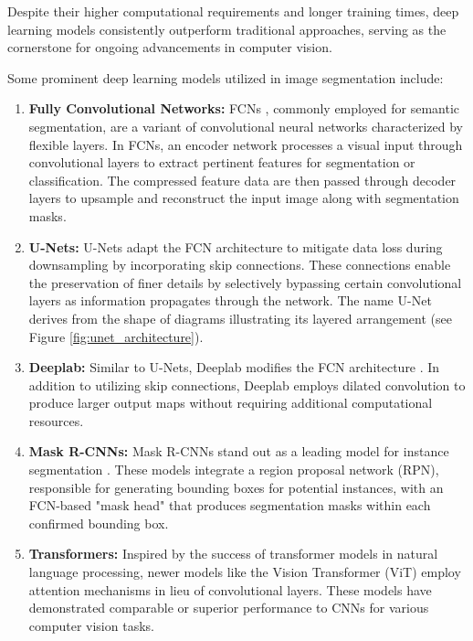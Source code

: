 Despite their higher computational requirements and longer training times, deep learning models consistently outperform traditional approaches, serving as the cornerstone for ongoing advancements in computer vision.

Some prominent deep learning models utilized in image segmentation include:

\begin{enumerate}
  \item \textbf{Fully Convolutional Networks:} FCNs \cite{FCNLong2015}, commonly employed for semantic segmentation, are a
  variant
  of
  convolutional neural networks characterized by flexible layers. In FCNs, an encoder network processes a visual input
  through convolutional layers to extract pertinent features for segmentation or classification. The compressed
  feature data are then passed through decoder layers to upsample and reconstruct the input image along with
  segmentation masks.
  \item \textbf{U-Nets:} U-Nets \cite{ronneberger2015unet} adapt the FCN architecture to mitigate data loss during downsampling by
  incorporating skip connections. These connections enable the preservation of finer details by selectively bypassing
  certain convolutional layers as information propagates through the network. The name U-Net derives from the shape 
  of diagrams illustrating its layered arrangement (see Figure \ref{fig:unet_architecture}).
  \item \textbf{Deeplab:} Similar to U-Nets, Deeplab modifies the FCN architecture \cite{Deeplab2018}. In addition to utilizing skip
  connections, Deeplab employs dilated convolution to produce larger output maps without requiring additional computational resources.
  \item \textbf{Mask R-CNNs:} Mask R-CNNs stand out as a leading model for instance segmentation \cite{MaskRCNN2017}. These models
  integrate a region proposal network (RPN), responsible for generating bounding boxes for potential instances, with an FCN-based "mask head" that produces segmentation masks within each confirmed bounding box.
  \item \textbf{Transformers:} Inspired by the success of transformer models \cite{vaswani2023attention} in natural language processing,
  newer models like the Vision Transformer (ViT) employ attention mechanisms in lieu of convolutional layers. These models have demonstrated comparable or superior performance to CNNs for various computer vision tasks.
\end{enumerate}


